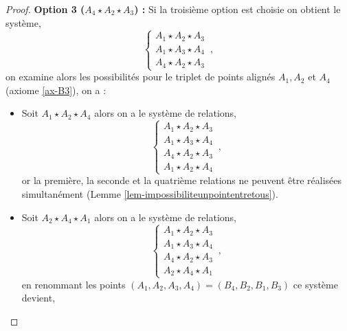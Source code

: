 \begin{cor}
\begin{proof}
        \textbf{Option 3 ($A_4 \star A_2 \star A_3$) :} Si la troisième option est choisie on obtient le système,
        \begin{equation*}
        \left\{
            \begin{array}{c}
                 A_1 \star A_2 \star A_3 \\
                 A_1 \star A_3 \star A_4 \\
                 A_4 \star A_2 \star A_3 
            \end{array}
            \right. \,,
        \end{equation*}
        on examine alors les possibilités pour le triplet de points alignés $A_1,A_2$ et $A_4$ (axiome \ref{ax-B3}), on a :
        \begin{itemize}[$\bullet$]
            \item Soit $A_1 \star A_2 \star A_4$ alors on a le système de relations,
            \begin{equation*}
            \left\{
            \begin{array}{c}
                 A_1 \star A_2 \star A_3 \\
                 A_1 \star A_3 \star A_4 \\
                 A_4 \star A_2 \star A_3 \\
                 A_1 \star A_2 \star A_4
            \end{array}
            \right. \,,    
            \end{equation*}
            or la première, la seconde et la quatrième relations ne peuvent être réalisées simultanément (Lemme \ref{lem-impossibiliteunpointentretous}). 
            \item Soit $A_2 \star A_4 \star A_1$ alors on a le système de relations,
            \begin{equation*}
            \left\{
            \begin{array}{c}
                 A_1 \star A_2 \star A_3 \\
                 A_1 \star A_3 \star A_4 \\
                 A_4 \star A_2 \star A_3 \\
                 A_2 \star A_4 \star A_1
            \end{array}
            \right. \,,    
            \end{equation*}
            en renommant les points $(A_1,A_2,A_3,A_4)=(B_4,B_2,B_1,B_3)$ ce système devient,
            \begin{equation*}

\end{equation*}
\end{itemize}
\end{proof}
\end{cor}
